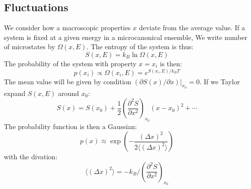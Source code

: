 \documentclass{article}
\begin{document}
\subsection{Fluctuations}
We consider how a macroscopic properties $x$ deviate from the average
value. If a system is fixed at a given energy in a microcanonical ensemble, 
We write number of microstates by $\Omega(x,E)$. The entropy of the system
is thus:
\begin{equation}
    S(x,E) = k_B \ln \Omega(x,E)
\end{equation}
The probability of the system with property $x = x_i$ is then:
\begin{equation}
    p(x_i) \propto \Omega(x_i,E) = e^{S(x_i,E)/k_B T}
\end{equation}
The mean value will be given by condition $ (\partial S(x) /\partial x) |_{x_0} = 0$. If we 
Taylor expand $S(x,E)$ around $x_0$:
\begin{equation}
    S(x) = S(x_0) + \frac{1}{2}\left( \frac{\partial^2 S}{\partial x^2} \right)_{x_0} (x - x_0)^2 + \cdots
\end{equation}
The probability function is then a Gaussian:
\begin{equation}
    p(x) \approx \exp\left( - \frac{(\Delta x)^2}{2 \langle (\Delta x)^2 \rangle } \right)
\end{equation}
with the divation:
\begin{equation}
    \langle (\Delta x)^2 \rangle = - k_B / \left( \frac{\partial^2 S}{\partial x^2} \right)_{x_0}
\end{equation}

\end{document}
